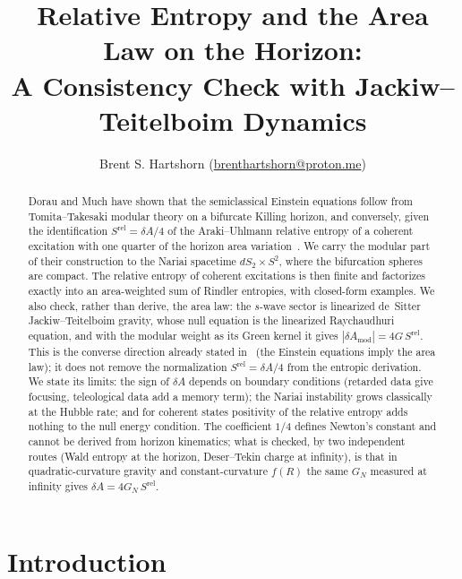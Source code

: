 \documentclass[11pt]{article}
\title{\textbf{Relative Entropy and the Area Law on the \Nariai{} Horizon:}\\ A Consistency Check with Jackiw--Teitelboim Dynamics}
\author{Brent S. Hartshorn \orcidlink{0009-0004-2853-655X} (\url{brenthartshorn@proton.me})}
\newcommand{\Srel}{S^{\mathrm{rel}}}
\begin{document}
\maketitle

\begin{abstract}
Dorau and Much have shown that the semiclassical Einstein equations follow from Tomita--Takesaki modular theory on a bifurcate Killing horizon, and conversely, given the identification $\Srel = \delta A/4$ of the Araki--Uhlmann relative entropy of a coherent excitation with one quarter of the horizon area variation~\cite{DorauMuch}. We carry the modular part of their construction to the Nariai spacetime $dS_2\times S^2$, where the bifurcation spheres are compact. The relative entropy of coherent excitations is then finite and factorizes exactly into an area-weighted sum of Rindler entropies, with closed-form examples. We also check, rather than derive, the area law: the $s$-wave sector is linearized de~Sitter Jackiw--Teitelboim gravity, whose null equation is the linearized Raychaudhuri equation, and with the modular weight as its Green kernel it gives $|\delta A_{\mathrm{mod}}| = 4G\,\Srel$. This is the converse direction already stated in~\cite{DorauMuch} (the Einstein equations imply the area law); it does not remove the normalization $\Srel = \delta A/4$ from the entropic derivation. We state its limits: the sign of $\delta A$ depends on boundary conditions (retarded data give focusing, teleological data add a memory term); the Nariai instability grows classically at the Hubble rate; and for coherent states positivity of the relative entropy adds nothing to the null energy condition. The coefficient $1/4$ defines Newton's constant and cannot be derived from horizon kinematics; what is checked, by two independent routes (Wald entropy at the horizon, Deser--Tekin charge at infinity), is that in quadratic-curvature gravity and constant-curvature $f(R)$ the same $G_N$ measured at infinity gives $\delta A=4G_N\,\Srel$.
\end{abstract}

\section{Introduction}
\label{sec:intro}
\end{document}
